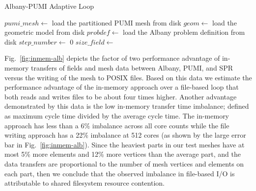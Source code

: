 \begin{algorithm}
  \caption{Albany-PUMI Adaptive Loop}\label{alg:albanyAdapt}
  \small
  \begin{algorithmic}[1]
      \State $pumi\_mesh \gets$ load the partitioned PUMI mesh from
      disk\label{alg:albAdpLoadMesh}
      \State $geom \gets$ load the geometric model from disk
      \State $probdef \gets$ load the Albany problem definition from
      disk\label{alg:albAdpLoadXML}
      \State {}\label{alg:albAdpConn} 
      \State {}\label{alg:albAdpSets}
      \State $step\_number \gets$ 0
      \label{alg:albAdpWhile}
        \State {}\label{alg:albAdpSolve}
        \State {}\label{alg:albAdpGetFields}
        \State $size\_field \gets$ \label{alg:albAdpSpr}
        \State {}\label{alg:albAdpAdapt}
        \State {}\label{alg:albAdpParma}
        \State {}\label{alg:albAdpConn2}
        \State {}\label{alg:albAdpSets2} 
        \State {}\label{alg:albAdpSetFields}
      \EndWhile
    \EndProcedure
  \end{algorithmic}
\end{algorithm}

Fig.~\ref{fig:inmem-alb} depicts the factor of two performance advantage of
in-memory transfers of fields and mesh data between Albany,
PUMI, and SPR versus
the writing of the mesh to POSIX files.
Based on this data we estimate the performance advantage of the in-memory
approach over a file-based loop that both reads and writes files to be
about four times higher.
Another advantage demonstrated by this data is the low in-memory transfer time
imbalance; defined as maximum cycle time divided by the average cycle time.
The in-memory approach has less than a 6\% imbalance across all core counts
while the file writing approach has a 22\% imbalance at 512 cores (as shown by
the large error bar in Fig.~\ref{fig:inmem-alb}).
Since the heaviest parts in our test meshes have at most 5\% more elements and
12\% more vertices than the average part, and the data transfers are
proportional to the number of mesh vertices and elements on each part, then we
conclude that the observed imbalance in file-based I/O is attributable to
shared filesystem resource contention.

